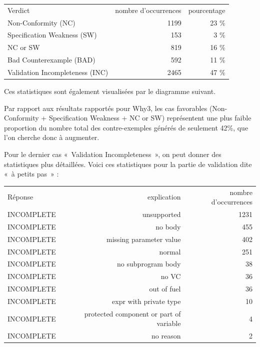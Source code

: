 \documentclass[a4paper,11pt]{article}
\begin{document}
\begin{center}
  \begin{tabular}{|l|r|r|}
    \hline
  \rowcolor{gray!50} Verdict
  & \multicolumn{1}{p{0.13\textwidth}|}{nombre d'occurrences}
  & \multicolumn{1}{p{0.13\textwidth}|}{pourcentage}
  \\
Non-Conformity (NC)            & 1199 & 23 \% \\
Specification Weakness (SW)    &  153 &  3 \% \\
NC or SW  	          &  819 & 16 \% \\
Bad Counterexample (BAD)       &  592 & 11 \% \\
    Validation Incompleteness (INC) & 2465 & 47 \% \\
    \hline
  \end{tabular}
\end{center}
Ces statistiques sont également visualisées par le diagramme
suivant.
  \begin{center}
\end{center}

Par rapport aux résultats rapportés pour Why3, les cas favorables
(Non-Conformity + Specification Weakness + NC or SW) représentent une plus
faible proportion du nombre total des contre-exemples générés de seulement 42\%,
que l'on cherche donc à augmenter.

Pour le dernier cas «~Validation Incompleteness~», on peut donner des
statistiques plus détaillées. Voici ces statistiques pour la partie de
validation dite «~à petits pas~» :

\begin{center}
  \begin{tabular}{|l|r|r|}
  \hline
  \rowcolor{gray!50} Réponse
  & \multicolumn{1}{p{0.65\textwidth}|}{explication}
  & \multicolumn{1}{p{0.13\textwidth}|}{nombre d'occurrences}
    \\
INCOMPLETE & unsupported                             & 1231 \\
INCOMPLETE & no body                                 &  455 \\
INCOMPLETE & missing parameter value                 &  402 \\
INCOMPLETE & normal                                  &  251 \\
INCOMPLETE & no subprogram body	                     &   38 \\
INCOMPLETE & no VC                                   &   36 \\
INCOMPLETE & out of fuel                             &   36 \\
INCOMPLETE & expr with private type                  &   10 \\
INCOMPLETE & protected component or part of variable &    4 \\
    INCOMPLETE & no reason                               &    2 \\
    \hline
\end{tabular}
\end{center}
\end{document}
